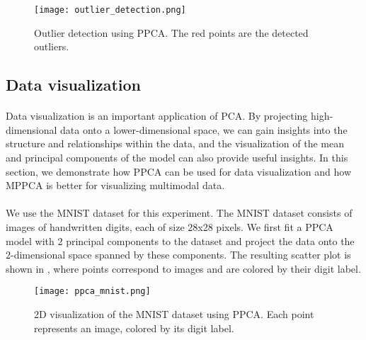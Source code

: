 \documentclass{article}
\begin{document}
\begin{figure}[H]
    \centering
    \texttt{[image: outlier\_detection.png]}
    \caption{Outlier detection using PPCA. The red points are the detected outliers.}
    \label{fig:outlier_detection}
\end{figure}

\subsection{Data visualization}




\paragraph{} Data visualization is an important application of PCA. By projecting high-dimensional data onto a lower-dimensional space, we can gain insights into the structure and relationships within the data, and the visualization of the mean and principal components of the model can also provide useful insights. In this section, we demonstrate how PPCA can be used for data visualization and how MPPCA is better for visualizing multimodal data.

\paragraph{} We use the MNIST dataset for this experiment. The MNIST dataset consists of images of handwritten digits, each of size 28x28 pixels. We first fit a PPCA model with 2 principal components to the dataset and project the data onto the 2-dimensional space spanned by these components. The resulting scatter plot is shown in , where points correspond to images and are colored by their digit label.

\begin{figure}[H]
    \centering
    \texttt{[image: ppca\_mnist.png]}
    \caption{2D visualization of the MNIST dataset using PPCA. Each point represents an image, colored by its digit label.}
    \label{fig:ppca_mnist}
\end{figure}
\end{document}
